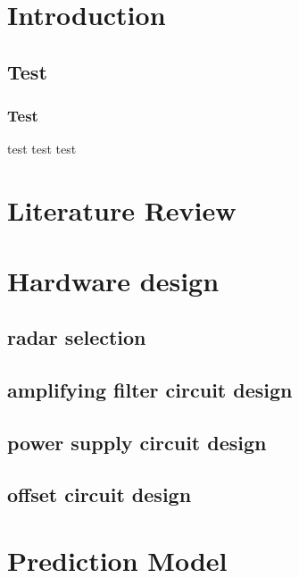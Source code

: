 \thispagestyle{empty}
\newpage

\tableofcontents{\protect\thispagestyle{empty}}
\pagestyle{fancy}
\clearpage
\setcounter{page}{1}
\newpage



\section{Introduction}


\subsection{Test}
\subsubsection{Test}
test \textcite{dirac} test
test


\section{Literature Review}


\section{Hardware design}


\subsection{radar selection}
\subsection{amplifying filter circuit design}
\subsection{power supply circuit design}
\subsection{offset circuit design}

\newpage
\section{Prediction Model}
